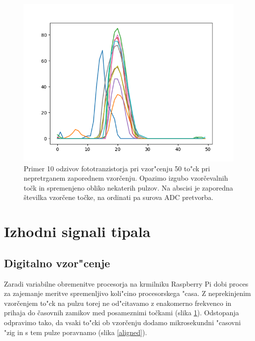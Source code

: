 \documentclass[12pt,a4paper]{article}
\begin{document}
\begin{figure}[H]
	\begin{center}
		\includegraphics[width=12cm]{pulses_old.png}
		\caption{Primer 10 odzivov fototranzistorja pri vzor"cenju 50 to"ck pri nepretrganem zaporednem vzorčenju. Opazimo izgubo vzorčevalnih točk in spremenjeno obliko nekaterih pulzov. Na abscisi je zaporedna številka vzorčene točke, na ordinati pa surova ADC pretvorba.}
		\label{pulses-old}
	\end{center}
\end{figure}

\clearpage

\section{Izhodni signali tipala}

\subsection{Digitalno vzor"cenje}
Zaradi variabilne obremenitve procesorja na krmilniku Raspberry Pi dobi proces za zajemanje meritve spremenljivo koli"cino procesorskega "casa. Z neprekinjenim vzorčenjem to"ck na pulzu torej ne od"citavamo z enakomerno frekvenco in prihaja do časovnih zamikov med posameznimi točkami (slika \ref{pulses-old}). Odstopanja odpravimo tako, da vsaki to"cki ob vzorčenju dodamo mikrosekundni "casovni "zig in s tem pulze poravnamo (slika \ref{aligned}).
\end{document}
